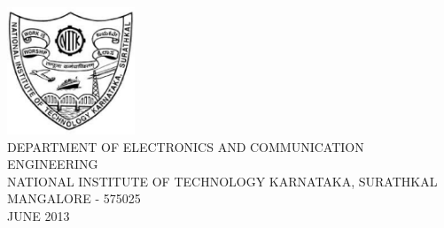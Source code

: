 \documentclass[a4paper,12pt]{report}
\begin{document}
\begin{titlepage}
\begin{center}
\vspace{1CM}
\includegraphics*[height=1.5in,width=1.5in]{./figures/Surthkal_logo.eps}\\
\vspace{1cm}
\MakeUppercase{{\large Department of Electronics and Communication Engineering}}\\
\vspace{0.2cm}
\MakeUppercase{{\large National Institute of Technology Karnataka, Surathkal}}\\
\vspace{0.2cm}
\MakeUppercase{{\large Mangalore - 575025}}\\
\vspace{.2cm}
\MakeUppercase{{\large June 2013}}\\
\end{center}
\end{titlepage}
\end{document}
